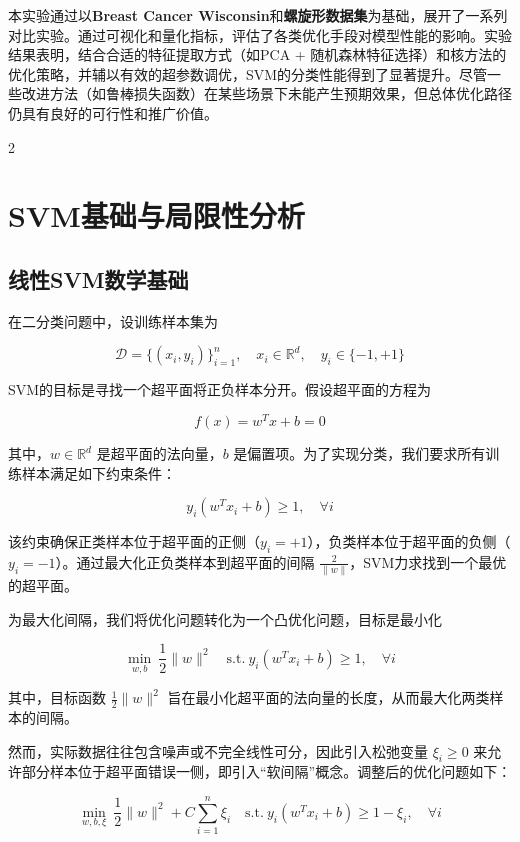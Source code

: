 \documentclass[twoside,dvipsnames]{CUGThesis}
\begin{document}
本实验通过以\textbf{Breast Cancer Wisconsin}和\textbf{螺旋形数据集}为基础，展开了一系列对比实验。通过可视化和量化指标，评估了各类优化手段对模型性能的影响。实验结果表明，结合合适的特征提取方式（如PCA + 随机森林特征选择）和核方法的优化策略，并辅以有效的超参数调优，SVM的分类性能得到了显著提升。尽管一些改进方法（如鲁棒损失函数）在某些场景下未能产生预期效果，但总体优化路径仍具有良好的可行性和推广价值。


        \newpage
        \begin{spacing}{2}
		\section{SVM基础与局限性分析}
	\end{spacing}
        \subsection{线性SVM数学基础}

在二分类问题中，设训练样本集为

\[
\mathcal{D} = \{(x_i, y_i)\}_{i=1}^n, \quad x_i \in \mathbb{R}^d, \quad y_i \in \{-1, +1\}
\]

SVM的目标是寻找一个超平面将正负样本分开。假设超平面的方程为

\[
f(x) = w^T x + b = 0 \tag{1}
\]

其中，\(w \in \mathbb{R}^d\) 是超平面的法向量，\(b\) 是偏置项。为了实现分类，我们要求所有训练样本满足如下约束条件：

\[
y_i(w^T x_i + b) \geq 1, \quad \forall i \tag{2}
\]

该约束确保正类样本位于超平面的正侧（\(y_i = +1\)），负类样本位于超平面的负侧（\(y_i = -1\)）。通过最大化正负类样本到超平面的间隔 \(\frac{2}{\|w\|}\)，SVM力求找到一个最优的超平面。

为最大化间隔，我们将优化问题转化为一个凸优化问题，目标是最小化

\[
\min_{w, b} \ \frac{1}{2} \|w\|^2 \quad \text{s.t.} \ y_i(w^T x_i + b) \geq 1, \quad \forall i \tag{3}
\]

其中，目标函数 \(\frac{1}{2} \|w\|^2\) 旨在最小化超平面的法向量的长度，从而最大化两类样本的间隔。

然而，实际数据往往包含噪声或不完全线性可分，因此引入松弛变量 \(\xi_i \geq 0\) 来允许部分样本位于超平面错误一侧，即引入“软间隔”概念。调整后的优化问题如下：

\[
\min_{w, b, \xi} \ \frac{1}{2} \|w\|^2 + C \sum_{i=1}^n \xi_i \quad \text{s.t.} \ y_i(w^T x_i + b) \geq 1 - \xi_i, \quad \forall i \tag{4}
\]
\end{document}
